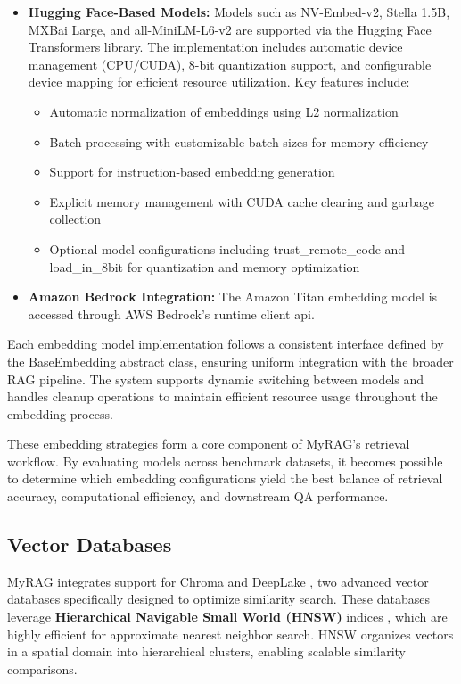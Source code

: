 \documentclass{scrartcl}
\begin{document}
\begin{itemize}
    \item \textbf{Hugging Face-Based Models:} Models such as NV-Embed-v2, Stella 1.5B, MXBai Large, and all-MiniLM-L6-v2 are supported via the Hugging Face Transformers library. The implementation includes automatic device management (CPU/CUDA), 8-bit quantization support, and configurable device mapping for efficient resource utilization. Key features include:
    \begin{itemize}
        \item Automatic normalization of embeddings using L2 normalization
        \item Batch processing with customizable batch sizes for memory efficiency
        \item Support for instruction-based embedding generation
        \item Explicit memory management with CUDA cache clearing and garbage collection
        \item Optional model configurations including trust\_remote\_code and load\_in\_8bit for quantization and memory optimization
    \end{itemize}
    
    \item \textbf{Amazon Bedrock Integration:} The Amazon Titan embedding model is accessed through AWS Bedrock's runtime client api. 
\end{itemize}

Each embedding model implementation follows a consistent interface defined by the BaseEmbedding abstract class, ensuring uniform integration with the broader RAG pipeline. The system supports dynamic switching between models and handles cleanup operations to maintain efficient resource usage throughout the embedding process.

These embedding strategies form a core component of MyRAG's retrieval workflow. By evaluating models across benchmark datasets, it becomes possible to determine which embedding configurations yield the best balance of retrieval accuracy, computational efficiency, and downstream QA performance.


\subsection{Vector Databases}

MyRAG integrates support for Chroma \cite{chroma} and DeepLake \cite{deeplake}, two advanced vector databases specifically designed to optimize similarity search. These databases leverage \textbf{Hierarchical Navigable Small World (HNSW)} indices \cite{malkov2016efficient}, which are highly efficient for approximate nearest neighbor search. HNSW organizes vectors in a spatial domain into hierarchical clusters, enabling scalable similarity comparisons.
\end{document}
